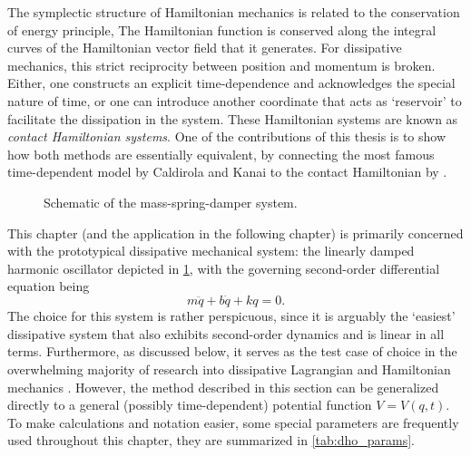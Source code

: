 The symplectic structure of Hamiltonian mechanics is related to the conservation of energy principle, The Hamiltonian function is conserved along the integral curves of the Hamiltonian vector field that it generates. For dissipative mechanics, this strict reciprocity between position and momentum is broken. Either, one constructs an explicit time-dependence and acknowledges the special nature of time, or one can introduce another coordinate that acts as `reservoir' to facilitate the dissipation in the system. These Hamiltonian systems are known as \emph{contact Hamiltonian systems}. One of the contributions of this thesis is to show how both methods are essentially equivalent, by connecting the most famous time-dependent model by Caldirola and Kanai to the contact Hamiltonian by \citet{Bravetti2017}.

\begin{figure}[ht!]
    \centering
    
    \caption{Schematic of the mass-spring-damper system.}
    \label{fig:dho}
\end{figure}
This chapter (and the application in the following chapter) is primarily concerned with the prototypical dissipative mechanical system: the linearly damped harmonic oscillator depicted in \cref{fig:dho}, with the governing second-order differential equation being
\begin{equation}  
  m\ddot{q} + b\dot{q} + kq = 0.
\end{equation}
The choice for this system is rather perspicuous, since it is arguably the `easiest' dissipative system that also exhibits second-order dynamics and is linear in all terms. Furthermore, as discussed below, it serves as the test case of choice in the overwhelming majority of research into dissipative Lagrangian and Hamiltonian mechanics
\cite{Dekker1981,Hutters2020b}. However, the method described in this section can be generalized directly to a general (possibly time-dependent) potential function $V = V(q, t)$. To make calculations and notation easier, some special parameters are frequently used throughout this chapter, they are summarized in \cref{tab:dho_params}.

